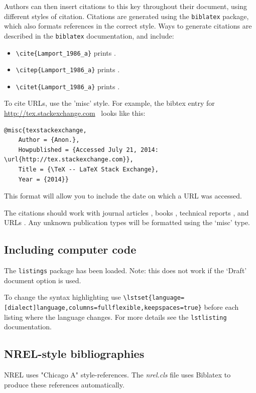 Authors can then insert citations to this key throughout their document, using different styles of citation. Citations are generated using the \texttt{biblatex} package, which also formats references in the correct style.  Ways to generate citations are described in the \texttt{biblatex} documentation, and include:
\begin{itemize}
\item \verb+\cite{Lamport_1986_a}+ prints \cite{Lamport_1986_a}.
\item \verb+\citep{Lamport_1986_a}+ prints \citep{Lamport_1986_a}.
\item \verb+\citet{Lamport_1986_a}+ prints \citet{Lamport_1986_a}.
\end{itemize}

To cite URLs, use the 'misc' style. For example, the bibtex entry for \href{http://tex.stackexchange.com}{http://tex.stackexchange.com}\ \cite{texstackexchange} looks like this:

\begin{lstlisting}
@misc{texstackexchange,
	Author = {Anon.},
	Howpublished = {Accessed July 21, 2014: \url{http://tex.stackexchange.com}},
	Title = {\TeX -- LaTeX Stack Exchange},
	Year = {2014}}
\end{lstlisting}

This format will allow you to include the date on which a URL was accessed.

The citations should work with journal articles \citep{Clifton_2013_a}, books \citep{Knuth_1984_a, Lamport_1986_a, chicago}, technical reports \citep{TechReportTest}, and URLs \citep{texstackexchange}. Any unknown publication types will be formatted using the `misc' type.

\subsection{Including computer code}
The \texttt{listings} package has been loaded. Note: this does not work if the `Draft' document option is used.

To change the syntax highlighting use \verb+\lstset{language=[dialect]language,columns=fullflexible,keepspaces=true}+ before each listing where the language changes. For more details see the \texttt{lstlisting} documentation.

\subsection{NREL-style bibliographies}
NREL uses "Chicago A" style-references. The \emph{nrel.cls} file uses Biblatex to produce these references automatically. 

